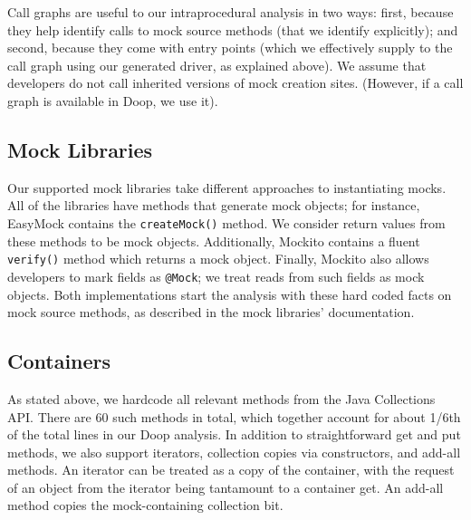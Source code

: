 Call graphs are useful to our intraprocedural analysis in two ways: first, because they help identify calls to mock source methods (that we identify explicitly); and second, because they come with entry points (which we effectively supply to the call graph using our generated driver, as explained above). We assume that developers do not call inherited versions of mock creation sites. (However, if a call graph is available in Doop, we use it). 

\subsection{Mock Libraries}

Our supported mock libraries take different approaches to instantiating mocks. All of the libraries have methods that generate mock objects; for instance, EasyMock contains the \texttt{createMock()} method. We consider return values from these methods to be mock objects. Additionally, Mockito contains a fluent \texttt{verify()} method which returns a mock object. Finally, Mockito also allows developers to mark fields as \texttt{@Mock}; we treat reads from such fields as mock objects. Both implementations start the analysis with these hard coded facts on mock source methods, as described in the mock libraries' documentation.

\subsection{Containers}

As stated above, we hardcode all relevant methods from the Java Collections API. There are 60 such methods in total, which together account for about 1/6th of the total lines in our Doop analysis. In addition to straightforward get and put methods, we also support iterators, collection copies via constructors, and add-all methods. An iterator can be treated as a copy of the container, with the request of an object from the iterator being tantamount to a container get. An add-all method copies the mock-containing collection bit.
